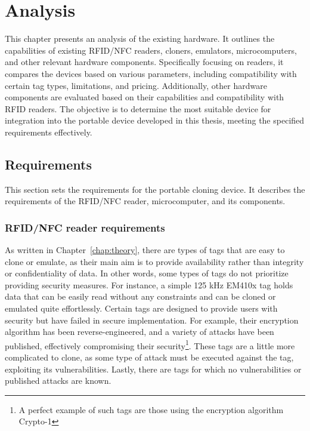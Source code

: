 \chapter{Analysis}

This chapter presents an analysis of the existing hardware. It outlines the capabilities of existing RFID/NFC readers, cloners, emulators, microcomputers, and other relevant hardware components. Specifically focusing on readers, it compares the devices based on various parameters, including compatibility with certain tag types, limitations, and pricing. Additionally, other hardware components are evaluated based on their capabilities and compatibility with RFID readers. The objective is to determine the most suitable device for integration into the portable device developed in this thesis, meeting the specified requirements effectively.


\section{Requirements}
\label{sec:requirements}

This section sets the requirements for the portable cloning device. It describes the requirements of the RFID/NFC reader, microcomputer, and its components.  

\subsection{RFID/NFC reader requirements}

As written in Chapter~\ref{chap:theory}, there are types of tags that are easy to clone or emulate, as their main aim is to provide availability rather than integrity or confidentiality of data. In other words, some types of tags do not prioritize providing security measures. For instance, a simple 125 kHz EM410x tag holds data that can be easily read without any constraints and can be cloned or emulated quite effortlessly. Certain tags are designed to provide users with security but have failed in secure implementation. For example, their encryption algorithm has been reverse-engineered, and a variety of attacks have been published, effectively compromising their security\footnote{A perfect example of such tags are those using the encryption algorithm Crypto-1}. These tags are a little more complicated to clone, as some type of attack must be executed against the tag, exploiting its vulnerabilities. Lastly, there are tags for which no vulnerabilities or published attacks are known.

